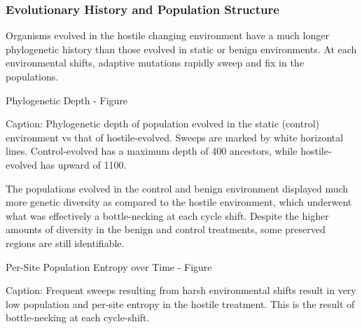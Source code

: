 \subsubsection{Evolutionary History and Population Structure}

Organisms evolved in the hostile changing environment have a much longer phylogenetic history than those evolved in static or benign environments. At each environmental shifts, adaptive mutations rapidly sweep and fix in the populations.

Phylogenetic Depth - Figure

Caption: Phylogenetic depth of population evolved in the static (control) environment vs that of hostile-evolved. Sweeps are marked by white horizontal lines. Control-evolved has a maximum depth of 400 ancestors, while hostile-evolved has upward of 1100.

The populations evolved in the control and benign environment displayed much more genetic diversity as compared to the hostile environment, which underwent what was effectively a bottle-necking at each cycle shift. Despite the higher amounts of diversity in the benign and control treatments, some preserved regions are still identifiable.

Per-Site Population Entropy over Time - Figure

Caption: Frequent sweeps resulting from harsh environmental shifts result in very low population and per-site entropy in the hostile treatment. This is the result of bottle-necking at each cycle-shift.

